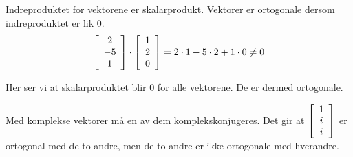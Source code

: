 \documentclass[11pt, a4paper, norsk]{NTNUoving}
\newenvironment{matrise}[1][c]{
        \left[
            \begin{array}{#1}
    }
    {    
    \end{array}
    \right]           
}
\begin{document}
\begin{oppgave}
    \begin{punkt}
        Indreproduktet for vektorene er skalarprodukt. Vektorer er ortogonale dersom indreproduktet er lik 0.
        \begin{align*}
            \begin{matrise}[c]
                2\\-5\\1
            \end{matrise}
            \cdot
            \begin{matrise}[c]
                1\\2\\0
            \end{matrise}
        = 2\cdot 1 - 5 \cdot 2 + 1\cdot 0 \neq 0
        \end{align*}
    \end{punkt}
    \begin{punkt}
        Her ser vi at skalarproduktet blir 0 for alle vektorene. De er dermed ortogonale.
    \end{punkt}
    \begin{punkt}
        Med komplekse vektorer må en av dem komplekskonjugeres. Det gir at $\begin{matrise}[c]
            1\\i\\i
        \end{matrise}$ er ortogonal med de to andre, men de to andre er ikke ortogonale med hverandre.
    \end{punkt}
\end{oppgave}
\end{document}
